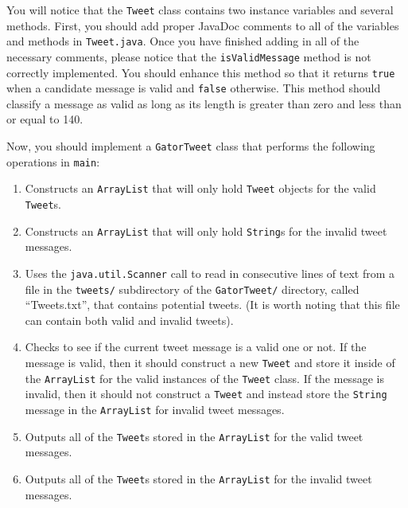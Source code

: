 You will notice that the {\tt Tweet} class contains two instance variables and several methods.  First, you should add proper
JavaDoc comments to all of the variables and methods in {\tt Tweet.java}.  Once you have finished adding in all of the necessary
comments, please notice that the {\tt isValidMessage} method is not correctly implemented.  You should enhance this method so that
it returns {\tt true} when a candidate message is valid and {\tt false} otherwise.  This method should classify a message as valid
as long as its length is greater than zero and less than or equal to 140.


Now, you should implement a {\tt GatorTweet} class that performs the following operations in {\tt main}:

\vspace*{-.1in}
\begin{enumerate}
  \item Constructs an {\tt ArrayList} that will only hold {\tt Tweet} objects for the valid {\tt Tweet}s.
  
  \item Constructs an {\tt ArrayList} that will only hold {\tt String}s for the invalid tweet messages.
  
  \item Uses the {\tt java.util.Scanner} call to read in consecutive lines of text from a file in the {\tt tweets/} subdirectory of
    the {\tt GatorTweet/} directory, called ``Tweets.txt'', that contains potential tweets. (It is worth noting that this file can
    contain both valid and invalid tweets).
  
  \item Checks to see if the current tweet message is a valid one or not.  If the message is valid, then it should construct a new
    {\tt Tweet} and store it inside of the {\tt ArrayList} for the valid instances of the {\tt Tweet} class.  If the message is
    invalid, then it should not construct a {\tt Tweet} and instead store the {\tt String} message in the {\tt ArrayList} for
    invalid tweet messages.

  \item Outputs all of the {\tt Tweet}s stored in the {\tt ArrayList} for the valid tweet messages. 

  \item Outputs all of the {\tt Tweet}s stored in the {\tt ArrayList} for the invalid tweet messages. 

\end{enumerate}

